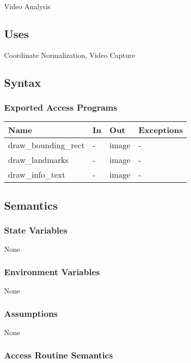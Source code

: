 \documentclass[12pt, titlepage]{article}
\begin{document}
Video Analysis

\subsection{Uses}

Coordinate Normalization, Video Capture

\subsection{Syntax}

\subsubsection{Exported Access Programs}

\begin{center}
\begin{tabular}{p{5cm} p{4cm} p{4cm} p{2cm}}
\hline
\textbf{Name} & \textbf{In} & \textbf{Out} & \textbf{Exceptions} \\
\hline
draw\_bounding\_rect & - & image & - \\
draw\_landmarks & - & image & - \\
draw\_info\_text & - & image & - \\
\hline
\end{tabular}
\end{center}

\subsection{Semantics}

\subsubsection{State Variables}

None

\subsubsection{Environment Variables}

None

\subsubsection{Assumptions}

None

\subsubsection{Access Routine Semantics}
\end{document}
